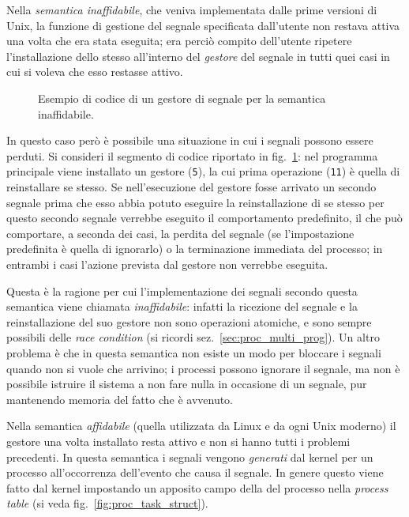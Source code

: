 Nella \textsl{semantica inaffidabile}, che veniva implementata dalle prime
versioni di Unix, la funzione di gestione del segnale specificata dall'utente
non restava attiva una volta che era stata eseguita; era perciò compito
dell'utente ripetere l'installazione dello stesso all'interno del
\textsl{gestore} del segnale in tutti quei casi in cui si voleva che esso
restasse attivo.

\begin{figure}[!htbp]
  \footnotesize \centering
  \begin{minipage}[c]{\codesamplewidth}
  \end{minipage} 
  \normalsize 
  \caption{Esempio di codice di un gestore di segnale per la semantica
    inaffidabile.} 
  \label{fig:sig_old_handler}
\end{figure}

In questo caso però è possibile una situazione in cui i segnali possono essere
perduti. Si consideri il segmento di codice riportato in
fig.~\ref{fig:sig_old_handler}: nel programma principale viene installato un
gestore (\texttt{\small 5}), la cui prima operazione (\texttt{\small 11}) è
quella di reinstallare se stesso. Se nell'esecuzione del gestore fosse
arrivato un secondo segnale prima che esso abbia potuto eseguire la
reinstallazione di se stesso per questo secondo segnale verrebbe eseguito il
comportamento predefinito, il che può comportare, a seconda dei casi, la
perdita del segnale (se l'impostazione predefinita è quella di ignorarlo) o la
terminazione immediata del processo; in entrambi i casi l'azione prevista dal
gestore non verrebbe eseguita.

Questa è la ragione per cui l'implementazione dei segnali secondo questa
semantica viene chiamata \textsl{inaffidabile}: infatti la ricezione del
segnale e la reinstallazione del suo gestore non sono operazioni atomiche, e
sono sempre possibili delle \textit{race condition} (si ricordi
sez.~\ref{sec:proc_multi_prog}).  Un altro problema è che in questa semantica
non esiste un modo per bloccare i segnali quando non si vuole che arrivino; i
processi possono ignorare il segnale, ma non è possibile istruire il sistema a
non fare nulla in occasione di un segnale, pur mantenendo memoria del fatto
che è avvenuto.

Nella semantica \textsl{affidabile} (quella utilizzata da Linux e da ogni Unix
moderno) il gestore una volta installato resta attivo e non si hanno tutti i
problemi precedenti. In questa semantica i segnali vengono \textsl{generati}
dal kernel per un processo all'occorrenza dell'evento che causa il segnale. In
genere questo viene fatto dal kernel impostando un apposito campo della
 del processo nella \textit{process table} (si veda
fig.~\ref{fig:proc_task_struct}).

